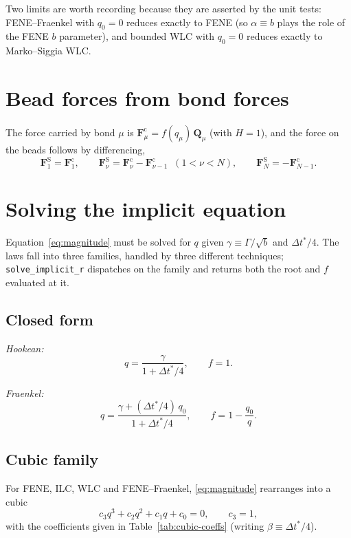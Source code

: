 \documentclass[11pt,a4paper]{report}
\newcommand{\Q}{\bm{Q}}
\newcommand{\dt}{\Delta t^{*}}
\newcommand{\code}[1]{\texttt{\seqsplitcode{#1}}}
\newcommand{\seqsplitcode}[1]{#1}
\begin{document}
Two limits are worth recording because they are asserted by the unit tests:
FENE--Fraenkel with $q_0 = 0$ reduces exactly to FENE (so $\alpha \equiv b$ plays
the role of the FENE $b$ parameter), and bounded WLC with $q_0 = 0$ reduces
exactly to Marko--Siggia WLC.

\section{Bead forces from bond forces}

The force carried by bond $\mu$ is $\bm{F}^{\mathrm{c}}_\mu = f(q_\mu)\,\Q_\mu$
(with $H=1$), and the force on the beads follows by differencing,
\begin{equation}
  \bm{F}^{\mathrm{S}}_1 = \bm{F}^{\mathrm{c}}_1, \qquad
  \bm{F}^{\mathrm{S}}_\nu = \bm{F}^{\mathrm{c}}_\nu - \bm{F}^{\mathrm{c}}_{\nu-1}
    \;\; (1<\nu<N), \qquad
  \bm{F}^{\mathrm{S}}_N = -\bm{F}^{\mathrm{c}}_{N-1}.
\end{equation}

\section{Solving the implicit equation}

Equation~\eqref{eq:magnitude} must be solved for $q$ given
$\gamma \equiv \Gamma/\sqrt{b}$ and $\dt/4$. The laws fall into three families,
handled by three different techniques; \code{solve\_implicit\_r} dispatches on
the family and returns both the root and $f$ evaluated at it.

\subsection{Closed form}

\emph{Hookean:}
\begin{equation}
  q = \frac{\gamma}{1 + \dt/4}, \qquad f = 1 .
\end{equation}

\emph{Fraenkel:}
\begin{equation}
  q = \frac{\gamma + (\dt/4)\,q_0}{1 + \dt/4}, \qquad f = 1 - \frac{q_0}{q}.
\end{equation}

\subsection{Cubic family}

For FENE, ILC, WLC and FENE--Fraenkel, \eqref{eq:magnitude} rearranges into a
cubic
\begin{equation}
  c_3 q^3 + c_2 q^2 + c_1 q + c_0 = 0, \qquad c_3 = 1,
\end{equation}
with the coefficients given in Table~\ref{tab:cubic-coeffs}
(writing $\beta \equiv \dt/4$).
\end{document}
